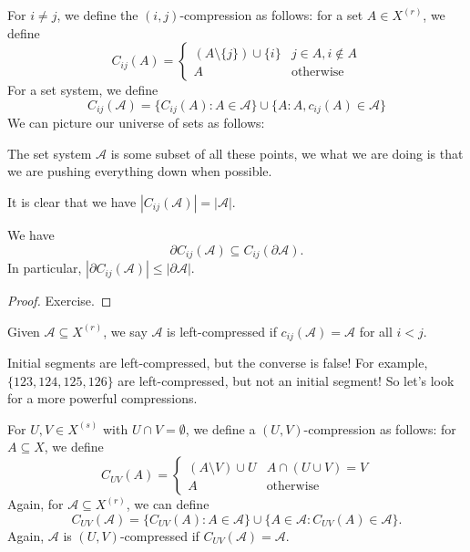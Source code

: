 \documentclass[a4paper]{article}
\begin{document}
For $i \not= j$, we define the $(i, j)$-compression as follows: for a set $A \in X^{(r)}$, we define
\[
  C_{ij}(A) =
  \begin{cases}
    (A \setminus \{j\}) \cup \{i\} & j \in A, i \not\in A\\
    A & \text{otherwise}
  \end{cases}
\]
For a set system, we define
\[
  C_{ij}(\mathcal{A}) = \{C_{ij}(A): A \in \mathcal{A}\} \cup \{A: A, c_{ij}(A) \in \mathcal{A}\}
\]
We can picture our universe of sets as follows:
\begin{center}
\end{center}
The set system $\mathcal{A}$ is some subset of all these points, we what we are doing is that we are pushing everything down when possible.

It is clear that we have $|C_{ij}(\mathcal{A})| = |\mathcal{A}|$.

\begin{lemma}
  We have
  \[
    \partial C_{ij}(\mathcal{A}) \subseteq C_{ij}(\partial \mathcal{A}).
  \]
  In particular, $|\partial C_{ij}(\mathcal{A})| \leq |\partial \mathcal{A}|$.
\end{lemma}

\begin{proof}
  Exercise.
\end{proof}

Given $\mathcal{A} \subseteq X^{(r)}$, we say $\mathcal{A}$ is left-compressed if $c_{ij}(\mathcal{A}) = \mathcal{A}$ for all $i < j$.

Initial segments are left-compressed, but the converse is false! For example, $\{123, 124, 125, 126\}$ are left-compressed, but not an initial segment! So let's look for a more powerful compressions.

For $U, V \in X^{(s)}$ with $U \cap V = \emptyset$, we define a $(U, V)$-compression as follows: for $A \subseteq X$, we define
\[
  C_{UV}(A) = 
  \begin{cases}
    (A \setminus V) \cup U & A \cap (U \cup V) = V\\
    A & \text{otherwise}
  \end{cases}
\]
Again, for $\mathcal{A} \subseteq X^{(r)}$, we can define
\[
  C_{UV}(\mathcal{A}) = \{C_{UV}(A) : A \in \mathcal{A}\} \cup \{A \in \mathcal{A}: C_{UV}(A) \in \mathcal{A}\}.
\]
Again, $\mathcal{A}$ is $(U, V)$-compressed if $C_{UV}(\mathcal{A}) = \mathcal{A}$.
\end{document}

